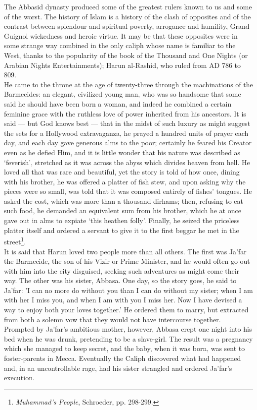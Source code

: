 \documentclass[10pt, twoside,openright]{book}
\begin{document}
The Abbasid dynasty produced some of the greatest rulers known to us and some of the worst. The 
history of Islam is a history of the clash of opposites and of the contrast between splendour and 
spiritual poverty, arrogance and humility, Grand Guignol wickedness and heroic virtue. It may be that 
these opposites were in some strange way combined in the only caliph whose name is familiar to the 
West, thanks to the popularity of the book of the Thousand and One Nights (or Arabian Nights 
Entertainments); Harun al\hyp{}Rashid, who ruled from AD 786 to 809. \\

He came to the throne at the age of twenty\hyp{}three through the machinations of the Barmecides: an 
elegant, civilized young man, who was so handsome that some said he should have been born a woman, 
and indeed he combined a certain feminine grace with the ruthless love of power inherited from his 
ancestors. It is said --- but God knows best --- that in the midst of such luxury as might suggest the 
sets for a Hollywood extravaganza, he prayed a hundred units of prayer each day, and each day gave 
generous alms to the poor; certainly he feared his Creator even as he defied Him, and it is little 
wonder that his nature was described as `feverish', stretched as it was across the abyss which 
divides heaven from hell. He loved all that was rare and beautiful, yet the story is told of how 
once, dining with his brother, he was offered a platter of fish stew, and upon asking why the pieces 
were so small, was told that it was composed entirely of fishes' tongues. He asked the cost, which 
was more than a thousand dirhams; then, refusing to eat such food, he demanded an equivalent sum from 
his brother, which he at once gave out in alms to expiate `this heathen folly'. Finally, he seized 
the priceless platter itself and ordered a servant to give it to the first beggar he met in the 
street\footnote{\emph{Muhammad's People}, Schroeder, pp. 298-299.}. \\

It is said that Harun loved two people more than all others. The first was Ja'far the Barmecide, the 
son of his Vizir or Prime Minister, and he would often go out with him into the city disguised, 
seeking such adventures as might come their way. The other was his sister, Abbasa. One day, so the 
story goes, he said to Ja'far: 'I can no more do without you than I can do without my sister; when I 
am with her I miss you, and when I am with you I miss her. Now I have devised a way to enjoy both 
your loves together.' He ordered them to marry, but extracted from both a solemn vow that they would 
not have intercourse together. Prompted by Ja'far's ambitious mother, however, Abbasa crept one night 
into his bed when he was drunk, pretending to be a slave\hyp{}girl. The result was a pregnancy which she 
managed to keep secret, and the baby, when it was born, was sent to foster\hyp{}parents in Mecca. 
Eventually the Caliph discovered what had happened and, in an uncontrollable rage, had his sister 
strangled and ordered Ja'far's execution. \\
\end{document}
